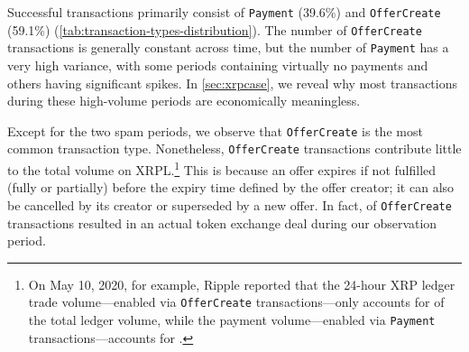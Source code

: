 Successful transactions primarily consist of \texttt{Payment} (39.6\%) and \texttt{OfferCreate} (59.1\%) (\autoref{tab:transaction-types-distribution}). The number of \texttt{OfferCreate} transactions is generally constant across time, but the number of \texttt{Payment} has a very high variance, with some periods containing virtually no payments and others having significant spikes.
In \autoref{sec:xrpcase}, we reveal why most transactions during these high-volume periods are economically meaningless.

Except for the two spam periods, we observe that \texttt{OfferCreate} is the most common transaction type.
Nonetheless, \texttt{OfferCreate} transactions contribute little to the total volume on XRPL.\footnote{
    On May 10, 2020, for example, Ripple reported that the 24-hour XRP ledger trade volume---enabled via \texttt{OfferCreate} transactions---only accounts for  of the total ledger volume, while the payment volume---enabled via \texttt{Payment} transactions---accounts for .
} This is because an offer expires if not fulfilled (fully or partially) before the expiry time defined by the offer creator; it can also be cancelled by its creator or superseded by a new offer. In fact,  of \texttt{OfferCreate} transactions resulted in an actual token exchange deal during our observation period.








